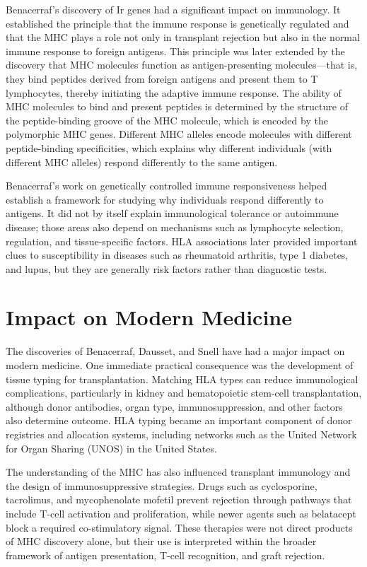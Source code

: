 Benacerraf's discovery of Ir genes had a significant impact on immunology. It established the principle that the immune response is genetically regulated and that the MHC plays a role not only in transplant rejection but also in the normal immune response to foreign antigens. This principle was later extended by the discovery that MHC molecules function as antigen-presenting molecules---that is, they bind peptides derived from foreign antigens and present them to T lymphocytes, thereby initiating the adaptive immune response. The ability of MHC molecules to bind and present peptides is determined by the structure of the peptide-binding groove of the MHC molecule, which is encoded by the polymorphic MHC genes. Different MHC alleles encode molecules with different peptide-binding specificities, which explains why different individuals (with different MHC alleles) respond differently to the same antigen.

Benacerraf's work on genetically controlled immune responsiveness helped establish a framework for studying why individuals respond differently to antigens. It did not by itself explain immunological tolerance or autoimmune disease; those areas also depend on mechanisms such as lymphocyte selection, regulation, and tissue-specific factors. HLA associations later provided important clues to susceptibility in diseases such as rheumatoid arthritis, type 1 diabetes, and lupus, but they are generally risk factors rather than diagnostic tests.

\section{Impact on Modern Medicine}

The discoveries of Benacerraf, Dausset, and Snell have had a major impact on modern medicine. One immediate practical consequence was the development of tissue typing for transplantation. Matching HLA types can reduce immunological complications, particularly in kidney and hematopoietic stem-cell transplantation, although donor antibodies, organ type, immunosuppression, and other factors also determine outcome. HLA typing became an important component of donor registries and allocation systems, including networks such as the United Network for Organ Sharing (UNOS) in the United States.

The understanding of the MHC has also influenced transplant immunology and the design of immunosuppressive strategies. Drugs such as cyclosporine, tacrolimus, and mycophenolate mofetil prevent rejection through pathways that include T-cell activation and proliferation, while newer agents such as belatacept block a required co-stimulatory signal. These therapies were not direct products of MHC discovery alone, but their use is interpreted within the broader framework of antigen presentation, T-cell recognition, and graft rejection.


